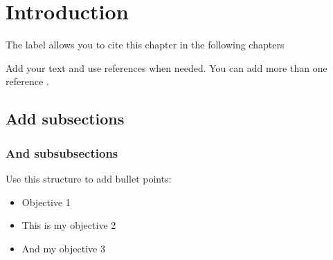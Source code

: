 \section{Introduction}
\label{sec:introduction} 

The label allows you to cite this chapter in the following chapters

\vspace{0.1 in}
\noindent

Add your text and use references \cite{UKGovernment} when needed. You can add more than one reference \cite{ZHENG201855, ZHENG201855, Das2010RecyclingVehicles}.


\vspace{0.1 in}
\noindent

\subsection{\textbf{Add subsections}}

\vspace{0.1 in}
\noindent

\subsubsection{\textbf{And subsubsections}}


\vspace{0.1 in}
\noindent

Use this structure to add bullet points:

\begin{itemize}

\item Objective 1

\item This is my objective 2

\item And my objective 3

\end{itemize}




